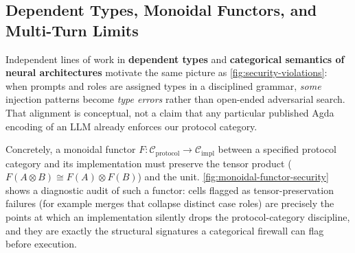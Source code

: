 \documentclass[
]{article}
\begin{document}
\subsection{Dependent Types, Monoidal Functors, and Multi-Turn
Limits}\label{dependent-types-monoidal-functors-and-multi-turn-limits}

Independent lines of work in \textbf{dependent types} and
\textbf{categorical semantics of neural architectures} motivate the same
picture as \autoref{fig:security-violations}: when prompts and roles are
assigned types in a disciplined grammar, \emph{some} injection patterns
become \emph{type errors} rather than open-ended adversarial search.
That alignment is conceptual, not a claim that any particular published
Agda encoding of an LLM already enforces our protocol category.

Concretely, a monoidal functor
\(F\colon \mathcal{C}_{\text{protocol}} \to \mathcal{C}_{\text{impl}}\)
between a specified protocol category and its implementation must
preserve the tensor product (\(F(A \otimes B) \cong F(A) \otimes F(B)\))
and the unit. \autoref{fig:monoidal-functor-security} shows a diagnostic
audit of such a functor: cells flagged as tensor-preservation failures
(for example merges that collapse distinct case roles) are precisely the
points at which an implementation silently drops the protocol-category
discipline, and they are exactly the structural signatures a categorical
firewall can flag before execution.
\end{document}
